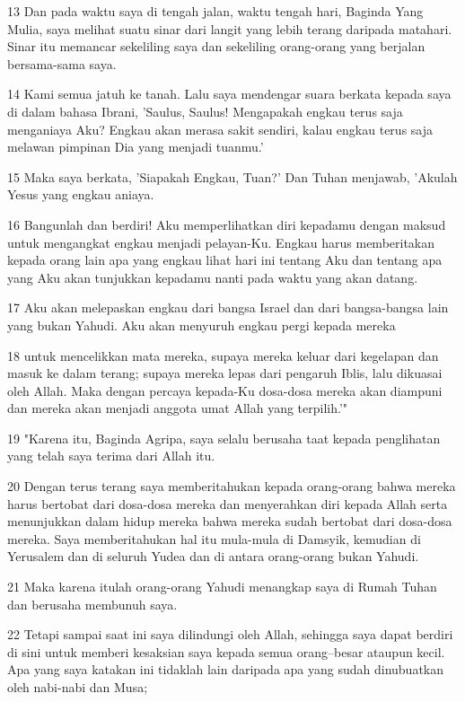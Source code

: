 \par 13 Dan pada waktu saya di tengah jalan, waktu tengah hari, Baginda Yang Mulia, saya melihat suatu sinar dari langit yang lebih terang daripada matahari. Sinar itu memancar sekeliling saya dan sekeliling orang-orang yang berjalan bersama-sama saya.
\par 14 Kami semua jatuh ke tanah. Lalu saya mendengar suara berkata kepada saya di dalam bahasa Ibrani, 'Saulus, Saulus! Mengapakah engkau terus saja menganiaya Aku? Engkau akan merasa sakit sendiri, kalau engkau terus saja melawan pimpinan Dia yang menjadi tuanmu.'
\par 15 Maka saya berkata, 'Siapakah Engkau, Tuan?' Dan Tuhan menjawab, 'Akulah Yesus yang engkau aniaya.
\par 16 Bangunlah dan berdiri! Aku memperlihatkan diri kepadamu dengan maksud untuk mengangkat engkau menjadi pelayan-Ku. Engkau harus memberitakan kepada orang lain apa yang engkau lihat hari ini tentang Aku dan tentang apa yang Aku akan tunjukkan kepadamu nanti pada waktu yang akan datang.
\par 17 Aku akan melepaskan engkau dari bangsa Israel dan dari bangsa-bangsa lain yang bukan Yahudi. Aku akan menyuruh engkau pergi kepada mereka
\par 18 untuk mencelikkan mata mereka, supaya mereka keluar dari kegelapan dan masuk ke dalam terang; supaya mereka lepas dari pengaruh Iblis, lalu dikuasai oleh Allah. Maka dengan percaya kepada-Ku dosa-dosa mereka akan diampuni dan mereka akan menjadi anggota umat Allah yang terpilih.'"
\par 19 "Karena itu, Baginda Agripa, saya selalu berusaha taat kepada penglihatan yang telah saya terima dari Allah itu.
\par 20 Dengan terus terang saya memberitahukan kepada orang-orang bahwa mereka harus bertobat dari dosa-dosa mereka dan menyerahkan diri kepada Allah serta menunjukkan dalam hidup mereka bahwa mereka sudah bertobat dari dosa-dosa mereka. Saya memberitahukan hal itu mula-mula di Damsyik, kemudian di Yerusalem dan di seluruh Yudea dan di antara orang-orang bukan Yahudi.
\par 21 Maka karena itulah orang-orang Yahudi menangkap saya di Rumah Tuhan dan berusaha membunuh saya.
\par 22 Tetapi sampai saat ini saya dilindungi oleh Allah, sehingga saya dapat berdiri di sini untuk memberi kesaksian saya kepada semua orang--besar ataupun kecil. Apa yang saya katakan ini tidaklah lain daripada apa yang sudah dinubuatkan oleh nabi-nabi dan Musa;
